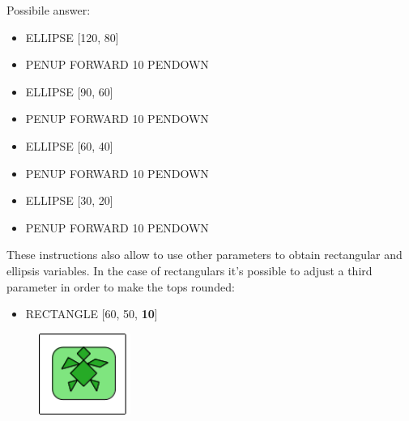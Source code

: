 \vskip 1cm
\pagebreak

Possibile answer:

\vskip 1cm

\begin{scriptsize}
\begin{minipage}{0.40\textwidth}
\begin{itemize}[itemsep=-3pt,parsep=2pt]
\item[] ELLIPSE [120, 80] 
\item[] PENUP FORWARD 10 PENDOWN
\item[] ELLIPSE [90, 60]         
\item[] PENUP FORWARD 10 PENDOWN
\item[] ELLIPSE [60, 40] 
\item[] PENUP FORWARD 10 PENDOWN
\item[] ELLIPSE [30, 20] 
\item[] PENUP FORWARD 10 PENDOWN 
\end{itemize}
\end{minipage}
\end{scriptsize}

\vskip 1cm

These instructions also allow to use other parameters to obtain rectangular and ellipsis variables. In the case of rectangulars it's possible to adjust a third parameter in order to make the tops rounded:

\vskip 1cm

\begin{scriptsize}
\begin{minipage}{0.40\textwidth}
\begin{itemize}[itemsep=-3pt,parsep=2pt]
\item[] RECTANGLE [60, 50, \textbf{10}]
\end{itemize}
\end{minipage}
\end{scriptsize}
\begin{minipage}{0.4\textwidth}
\begin{figure}[H]
   \includegraphics[width=3.0cm,trim=4 4 8 4,clip]{./images/disegnare/disegnare-25.png}
   \label{dis-24}
\end{figure}
\end{minipage} \hfill

